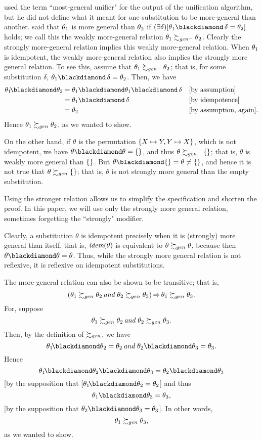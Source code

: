 \documentclass[runningheads]{llncs}
\DeclareMathOperator{\uand}{\emph{and}\,}
\DeclareMathOperator{\uimplies}{\Rightarrow}
\DeclareMathOperator{\idem}{\emph{idem}}
\begin{document}
 \citet{rob} used the term “most-general unifier" for the output of the unification algorithm, but he did not define what it meant for one substitution to be more-general than another.   \citep{man:wal} said that  $\theta_{1}$ is more general than $\theta_{2}$ if $(\exists \delta)[\thet{1} \compose \, \delta = \thet{2}]$ holds; we call this the weakly more-general relation $\theta_{1} \succsim_{gen^-} \theta_{2}$.  Clearly the strongly more-general relation implies this weakly more-general relation.  When $\theta_{1}$ is idempotent, the weakly more-general relation also implies the  strongly more general relation.  To see this, assume that $\theta_{1} \succsim_{gen^-} \theta_{2}$; that is, for some substitution $\delta$,  $\thet{1} \compose \, \delta = \thet{2}$.  Then,  we have 
 \begin{align*}
   \thet{1}\! \compose \thet{2}
     & =  \thet{1} \compose \thet{1} \compose \, \delta  && \text{[by assumption]} \\
     & = \thet{1} \compose \, \delta  && \text{[by idempotence]} \\
     & = \thet{2} && \text{[by assumption, again].}
 \end{align*}
 \noindent Hence $\theta_{1} \succsim_{gen} \theta_{2}$, as we wanted to show.

 On the other hand, if $\theta$ is the  permutation $\{X \mapsto Y, \allowbreak Y \mapsto X\}$, which is not idempotent, we have $\theta \compose \theta = \emptysubst$, and thus $\theta \succsim_{gen^-} \{\}$; that is,  $\theta$
is  weakly more general than 
$\{\}$.  But $\theta \compose \emptysubst = \theta \neq \emptysubst$, and hence it is not true that $\theta \succsim_{gen} \{\}$; that is, $\theta$ is not strongly more general than the empty substitution.

Using the stronger relation allows us to simplify the specification and shorten the proof. In this paper, we will use only the strongly more general relation, sometimes forgetting the “strongly" modifier.


Clearly, a substitution $\theta$ is idempotent precisely when it is (strongly) more  general than itself, that is, $\idem(\theta)$ is equivalent to $ \theta \succsim_{gen} \theta$, because then $\theta \compose \theta = \theta$. Thus, while the strongly more general relation is not reflexive, it is reflexive on idempotent substitutions. 

The more-general relation can also be shown to be transitive; that is,
\[(\thet{1} \moregen \thet{2} \uand 
\thet{2} \moregen \thet{3}) \uimplies \thet{1} \moregen \thet{3}.\]
For, suppose \[\thet{1} \moregen \thet{2} \uand 
\thet{2} \moregen \thet{3}.\]  
Then, by the definition of $\succsim_{gen}$, we have \[\thet{1}\! \compose \thet{2} = \thet{2} \uand \thet{2} \compose \thet{3} = \thet{3}.\]  Hence \[\thet{1}\! \compose \thet{2} \compose \thet{3} =  \thet{2} \compose \thet{3}\] [by the supposition that [$\thet{1}\! \compose \thet{2} = \thet{2}$] and thus \[\thet{1} \compose \thet{3} = \thet{3},\] [by the supposition that $\thet{2} \compose \thet{3} = \thet{3}$]. In other words, \[\theta_{1} \succsim_{gen} \theta_{3},\] as we wanted to show.
\end{document}
